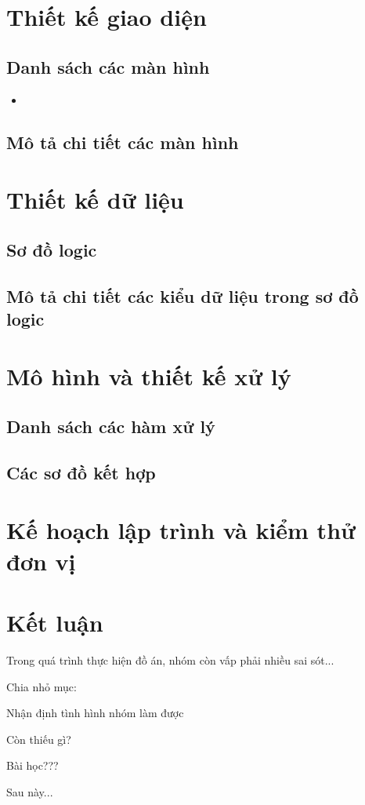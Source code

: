 \documentclass{article}
\begin{document}
\begin{itemize}
\begin{itemize}
				\end{itemize}
			
		\end{itemize}

	\newpage
	\section{Thiết kế giao diện}
	\subsection{Danh sách các màn hình}
	
		\begin{itemize}
			\item 
		\end{itemize}
	
	\subsection{Mô tả chi tiết các màn hình}
	
	\section{Thiết kế dữ liệu}
	\subsection{Sơ đồ logic}
	\subsection{Mô tả chi tiết các kiểu dữ liệu trong sơ đồ logic}
	
	\section{Mô hình và thiết kế xử lý}
	\subsection{Danh sách các hàm xử lý}
	\subsection{Các sơ đồ kết hợp}
	
	\section{Kế hoạch lập trình và kiểm thử đơn vị}
	
	\section{Kết luận}
	
	Trong quá trình thực hiện đồ án, nhóm còn vấp phải nhiều sai sót...
	
	
	Chia nhỏ mục:
	
	Nhận định tình hình nhóm làm được
	
	Còn thiếu gì?
	
	Bài học???
	
	Sau này...
	
\end{document}
